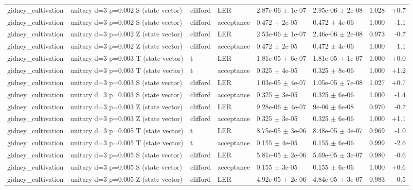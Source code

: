 \documentclass[10pt]{article}
\begin{document}
{\begin{longtable}{l l l l l l r r}
gidney\_cultivation & unitary d=3 p=0.002 S (state vector) & clifford & LER & 2.87e-06 $\pm$ 1e-07 & 2.95e-06 $\pm$ 2e-08 & 1.028 & +0.7 \\
gidney\_cultivation & unitary d=3 p=0.002 S (state vector) & clifford & acceptance & 0.472 $\pm$ 2e-05 & 0.472 $\pm$ 4e-06 & 1.000 & -1.1 \\
gidney\_cultivation & unitary d=3 p=0.002 Z (state vector) & clifford & LER & 2.53e-06 $\pm$ 1e-07 & 2.46e-06 $\pm$ 2e-08 & 0.973 & -0.7 \\
gidney\_cultivation & unitary d=3 p=0.002 Z (state vector) & clifford & acceptance & 0.472 $\pm$ 2e-05 & 0.472 $\pm$ 4e-06 & 1.000 & -1.1 \\
gidney\_cultivation & unitary d=3 p=0.003 T (state vector) & t & LER & 1.81e-05 $\pm$ 6e-07 & 1.81e-05 $\pm$ 1e-07 & 1.000 & +0.0 \\
gidney\_cultivation & unitary d=3 p=0.003 T (state vector) & t & acceptance & 0.325 $\pm$ 4e-05 & 0.325 $\pm$ 8e-06 & 1.000 & +1.2 \\
gidney\_cultivation & unitary d=3 p=0.003 S (state vector) & clifford & LER & 1.03e-05 $\pm$ 4e-07 & 1.05e-05 $\pm$ 7e-08 & 1.027 & +0.7 \\
gidney\_cultivation & unitary d=3 p=0.003 S (state vector) & clifford & acceptance & 0.325 $\pm$ 3e-05 & 0.325 $\pm$ 6e-06 & 1.000 & -1.4 \\
gidney\_cultivation & unitary d=3 p=0.003 Z (state vector) & clifford & LER & 9.28e-06 $\pm$ 4e-07 & 9e-06 $\pm$ 6e-08 & 0.970 & -0.7 \\
gidney\_cultivation & unitary d=3 p=0.003 Z (state vector) & clifford & acceptance & 0.325 $\pm$ 3e-05 & 0.325 $\pm$ 6e-06 & 1.000 & +1.1 \\
gidney\_cultivation & unitary d=3 p=0.005 T (state vector) & t & LER & 8.75e-05 $\pm$ 3e-06 & 8.48e-05 $\pm$ 4e-07 & 0.969 & -1.0 \\
gidney\_cultivation & unitary d=3 p=0.005 T (state vector) & t & acceptance & 0.155 $\pm$ 4e-05 & 0.155 $\pm$ 6e-06 & 0.999 & -2.6 \\
gidney\_cultivation & unitary d=3 p=0.005 S (state vector) & clifford & LER & 5.81e-05 $\pm$ 2e-06 & 5.69e-05 $\pm$ 3e-07 & 0.980 & -0.6 \\
gidney\_cultivation & unitary d=3 p=0.005 S (state vector) & clifford & acceptance & 0.155 $\pm$ 3e-05 & 0.155 $\pm$ 6e-06 & 1.000 & +0.6 \\
gidney\_cultivation & unitary d=3 p=0.005 Z (state vector) & clifford & LER & 4.92e-05 $\pm$ 2e-06 & 4.84e-05 $\pm$ 3e-07 & 0.983 & -0.5 \\

\end{longtable}}
\end{document}
